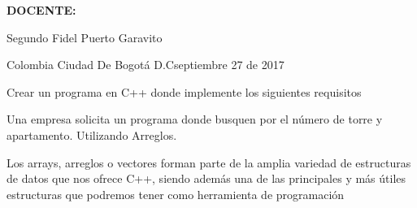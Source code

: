 \documentclass[a4paper,12pt]{article}
\begin{document}
\noindent \begin{Center}
{\fontsize{14pt}{14pt}\selectfont \textbf{DOCENTE: }}
\end{Center}\par


\noindent \begin{Center}
{\fontsize{14pt}{14pt}\selectfont Segundo Fidel Puerto Garavito}
\end{Center}\par


\noindent \begin{Center}
{\fontsize{14pt}{14pt}\selectfont Colombia Ciudad De Bogotá D.C\hspace*{0.49in}\hspace*{0.49in}\hspace*{0.49in}septiembre 27 de 2017}
\end{Center}\par


\noindent \begin{justify}
Crear un programa en C++ donde implemente los siguientes requisitos
\end{justify}\par


\noindent \begin{justify}
Una empresa solicita un programa donde busquen por el número de torre y apartamento. Utilizando Arreglos.
\end{justify}\par


\noindent \begin{justify}
Los arrays, arreglos o vectores forman parte de la amplia variedad de estructuras de datos que nos ofrece C++, siendo además una de las principales y más útiles estructuras que podremos tener como herramienta de programación
\end{justify}\par


\noindent \begin{justify}

\end{justify}
\vspace{12pt}
\par


\par


\par
\end{document}
